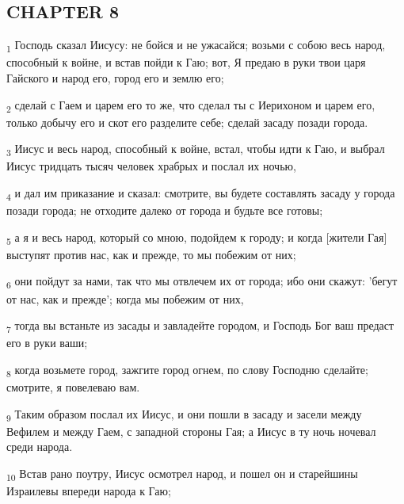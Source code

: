 \subsection{CHAPTER 8}
\begin{tcolorbox}
\textsubscript{1} Господь сказал Иисусу: не бойся и не ужасайся; возьми с собою весь народ, способный к войне, и встав пойди к Гаю; вот, Я предаю в руки твои царя Гайского и народ его, город его и землю его;
\end{tcolorbox}
\begin{tcolorbox}
\textsubscript{2} сделай с Гаем и царем его то же, что сделал ты с Иерихоном и царем его, только добычу его и скот его разделите себе; сделай засаду позади города.
\end{tcolorbox}
\begin{tcolorbox}
\textsubscript{3} Иисус и весь народ, способный к войне, встал, чтобы идти к Гаю, и выбрал Иисус тридцать тысяч человек храбрых и послал их ночью,
\end{tcolorbox}
\begin{tcolorbox}
\textsubscript{4} и дал им приказание и сказал: смотрите, вы будете составлять засаду у города позади города; не отходите далеко от города и будьте все готовы;
\end{tcolorbox}
\begin{tcolorbox}
\textsubscript{5} а я и весь народ, который со мною, подойдем к городу; и когда [жители Гая] выступят против нас, как и прежде, то мы побежим от них;
\end{tcolorbox}
\begin{tcolorbox}
\textsubscript{6} они пойдут за нами, так что мы отвлечем их от города; ибо они скажут: 'бегут от нас, как и прежде'; когда мы побежим от них,
\end{tcolorbox}
\begin{tcolorbox}
\textsubscript{7} тогда вы встаньте из засады и завладейте городом, и Господь Бог ваш предаст его в руки ваши;
\end{tcolorbox}
\begin{tcolorbox}
\textsubscript{8} когда возьмете город, зажгите город огнем, по слову Господню сделайте; смотрите, я повелеваю вам.
\end{tcolorbox}
\begin{tcolorbox}
\textsubscript{9} Таким образом послал их Иисус, и они пошли в засаду и засели между Вефилем и между Гаем, с западной стороны Гая; а Иисус в ту ночь ночевал среди народа.
\end{tcolorbox}
\begin{tcolorbox}
\textsubscript{10} Встав рано поутру, Иисус осмотрел народ, и пошел он и старейшины Израилевы впереди народа к Гаю;
\end{tcolorbox}
